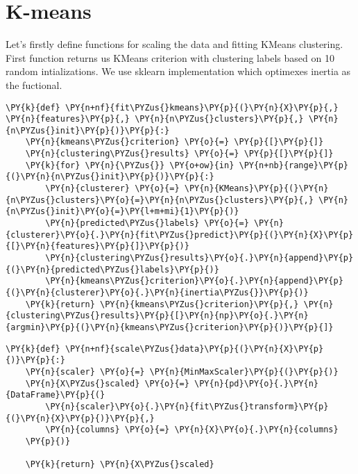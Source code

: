 \section*{K-means}

    Let's firstly define functions for scaling the data and fitting KMeans
clustering. First function returns us KMeans criterion with clustering
labels based on 10 random intializations. We use sklearn implementation
which optimexes inertia as the fuctional.

    \begin{tcolorbox}[breakable, size=fbox, boxrule=1pt, pad at break*=1mm,colback=cellbackground, colframe=cellborder]
\begin{Verbatim}[commandchars=\\\{\}]
\PY{k}{def} \PY{n+nf}{fit\PYZus{}kmeans}\PY{p}{(}\PY{n}{X}\PY{p}{,} \PY{n}{features}\PY{p}{,} \PY{n}{n\PYZus{}clusters}\PY{p}{,} \PY{n}{n\PYZus{}init}\PY{p}{)}\PY{p}{:}
    \PY{n}{kmeans\PYZus{}criterion} \PY{o}{=} \PY{p}{[}\PY{p}{]}
    \PY{n}{clustering\PYZus{}results} \PY{o}{=} \PY{p}{[}\PY{p}{]}
    \PY{k}{for} \PY{n}{\PYZus{}} \PY{o+ow}{in} \PY{n+nb}{range}\PY{p}{(}\PY{n}{n\PYZus{}init}\PY{p}{)}\PY{p}{:}
        \PY{n}{clusterer} \PY{o}{=} \PY{n}{KMeans}\PY{p}{(}\PY{n}{n\PYZus{}clusters}\PY{o}{=}\PY{n}{n\PYZus{}clusters}\PY{p}{,} \PY{n}{n\PYZus{}init}\PY{o}{=}\PY{l+m+mi}{1}\PY{p}{)}
        \PY{n}{predicted\PYZus{}labels} \PY{o}{=} \PY{n}{clusterer}\PY{o}{.}\PY{n}{fit\PYZus{}predict}\PY{p}{(}\PY{n}{X}\PY{p}{[}\PY{n}{features}\PY{p}{]}\PY{p}{)}
        \PY{n}{clustering\PYZus{}results}\PY{o}{.}\PY{n}{append}\PY{p}{(}\PY{n}{predicted\PYZus{}labels}\PY{p}{)}
        \PY{n}{kmeans\PYZus{}criterion}\PY{o}{.}\PY{n}{append}\PY{p}{(}\PY{n}{clusterer}\PY{o}{.}\PY{n}{inertia\PYZus{}}\PY{p}{)}
    \PY{k}{return} \PY{n}{kmeans\PYZus{}criterion}\PY{p}{,} \PY{n}{clustering\PYZus{}results}\PY{p}{[}\PY{n}{np}\PY{o}{.}\PY{n}{argmin}\PY{p}{(}\PY{n}{kmeans\PYZus{}criterion}\PY{p}{)}\PY{p}{]}
\end{Verbatim}
\end{tcolorbox}

    \begin{tcolorbox}[breakable, size=fbox, boxrule=1pt, pad at break*=1mm,colback=cellbackground, colframe=cellborder]
\begin{Verbatim}[commandchars=\\\{\}]
\PY{k}{def} \PY{n+nf}{scale\PYZus{}data}\PY{p}{(}\PY{n}{X}\PY{p}{)}\PY{p}{:}
    \PY{n}{scaler} \PY{o}{=} \PY{n}{MinMaxScaler}\PY{p}{(}\PY{p}{)}
    \PY{n}{X\PYZus{}scaled} \PY{o}{=} \PY{n}{pd}\PY{o}{.}\PY{n}{DataFrame}\PY{p}{(}
        \PY{n}{scaler}\PY{o}{.}\PY{n}{fit\PYZus{}transform}\PY{p}{(}\PY{n}{X}\PY{p}{)}\PY{p}{,}
        \PY{n}{columns} \PY{o}{=} \PY{n}{X}\PY{o}{.}\PY{n}{columns}
    \PY{p}{)}
    
    \PY{k}{return} \PY{n}{X\PYZus{}scaled}
    
\end{Verbatim}
\end{tcolorbox}


